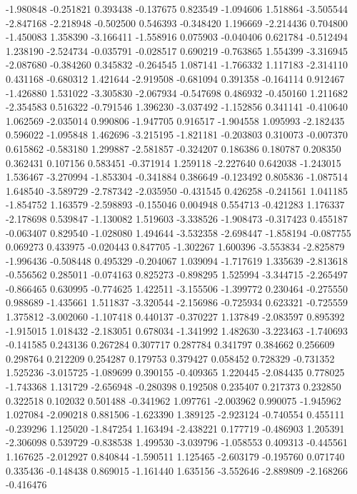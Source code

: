 -1.980848
-0.251821
0.393438
-0.137675
0.823549
-1.094606
1.518864
-3.505544
-2.847168
-2.218948
-0.502500
0.546393
-0.348420
1.196669
-2.214436
0.704800
-1.450083
1.358390
-3.166411
-1.558916
0.075903
-0.040406
0.621784
-0.512494
1.238190
-2.524734
-0.035791
-0.028517
0.690219
-0.763865
1.554399
-3.316945
-2.087680
-0.384260
0.345832
-0.264545
1.087141
-1.766332
1.117183
-2.314110
0.431168
-0.680312
1.421644
-2.919508
-0.681094
0.391358
-0.164114
0.912467
-1.426880
1.531022
-3.305830
-2.067934
-0.547698
0.486932
-0.450160
1.211682
-2.354583
0.516322
-0.791546
1.396230
-3.037492
-1.152856
0.341141
-0.410640
1.062569
-2.035014
0.990806
-1.947705
0.916517
-1.904558
1.095993
-2.182435
0.596022
-1.095848
1.462696
-3.215195
-1.821181
-0.203803
0.310073
-0.007370
0.615862
-0.583180
1.299887
-2.581857
-0.324207
0.186386
0.180787
0.208350
0.362431
0.107156
0.583451
-0.371914
1.259118
-2.227640
0.642038
-1.243015
1.536467
-3.270994
-1.853304
-0.341884
0.386649
-0.123492
0.805836
-1.087514
1.648540
-3.589729
-2.787342
-2.035950
-0.431545
0.426258
-0.241561
1.041185
-1.854752
1.163579
-2.598893
-0.155046
0.004948
0.554713
-0.421283
1.176337
-2.178698
0.539847
-1.130082
1.519603
-3.338526
-1.908473
-0.317423
0.455187
-0.063407
0.829540
-1.028080
1.494644
-3.532358
-2.698447
-1.858194
-0.087755
0.069273
0.433975
-0.020443
0.847705
-1.302267
1.600396
-3.553834
-2.825879
-1.996436
-0.508448
0.495329
-0.204067
1.039094
-1.717619
1.335639
-2.813618
-0.556562
0.285011
-0.074163
0.825273
-0.898295
1.525994
-3.344715
-2.265497
-0.866465
0.630995
-0.774625
1.422511
-3.155506
-1.399772
0.230464
-0.275550
0.988689
-1.435661
1.511837
-3.320544
-2.156986
-0.725934
0.623321
-0.725559
1.375812
-3.002060
-1.107418
0.440137
-0.370227
1.137849
-2.083597
0.895392
-1.915015
1.018432
-2.183051
0.678034
-1.341992
1.482630
-3.223463
-1.740693
-0.141585
0.243136
0.267284
0.307717
0.287784
0.341797
0.384662
0.256609
0.298764
0.212209
0.254287
0.179753
0.379427
0.058452
0.728329
-0.731352
1.525236
-3.015725
-1.089699
0.390155
-0.409365
1.220445
-2.084435
0.778025
-1.743368
1.131729
-2.656948
-0.280398
0.192508
0.235407
0.217373
0.232850
0.322518
0.102032
0.501488
-0.341962
1.097761
-2.003962
0.990075
-1.945962
1.027084
-2.090218
0.881506
-1.623390
1.389125
-2.923124
-0.740554
0.455111
-0.239296
1.125020
-1.847254
1.163494
-2.438221
0.177719
-0.486903
1.205391
-2.306098
0.539729
-0.838538
1.499530
-3.039796
-1.058553
0.409313
-0.445561
1.167625
-2.012927
0.840844
-1.590511
1.125465
-2.603179
-0.195760
0.071740
0.335436
-0.148438
0.869015
-1.161440
1.635156
-3.552646
-2.889809
-2.168266
-0.416476
